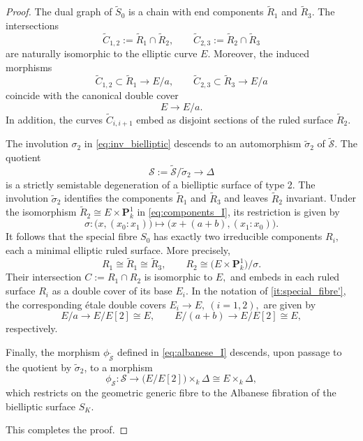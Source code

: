 \documentclass[10pt,a4paper]{amsart}
\newcommand{\bbP}{\mathbf{P}}
\newcommand{\ca}[1]{{\mathcal{#1}}}
\begin{document}
\begin{proof}
The dual graph of $\widetilde{S}_{0}$ is a chain with end components $\widetilde{R}_{1}$ and $ \widetilde{R}_{3}$. The intersections 
\begin{equation*}
    \widetilde{C}_{1,2}:= \widetilde{R}_{1}\cap \widetilde{R}_{2},\qquad \widetilde{C}_{2,3}:=\widetilde{R}_{2}\cap \widetilde{R}_{3}
\end{equation*}
are naturally isomorphic to the elliptic curve $E$. Moreover, the induced morphisms $$ \widetilde{C}_{1,2}\subset \widetilde{R}_{1} \longrightarrow E/a,\qquad \widetilde{C}_{2,3}\subset \widetilde{R}_{3} \longrightarrow E/a$$ coincide with the canonical double cover $$E\longrightarrow E/a.$$ In addition, the curves $\widetilde{C}_{i,i+1}$ embed as disjoint sections of the ruled surface $\widetilde{R}_{2}$.\par
The involution $\sigma_{2}$ in \eqref{eq:inv_bielliptic} descends to an automorphism $\widetilde{\sigma}_{2}$ of $\widetilde{\ca S}$. The quotient \begin{equation}\label{eq:deg_II}
    \ca S:=\widetilde{\ca S}/\widetilde{\sigma}_{2}\longrightarrow\Delta
\end{equation}
is a strictly semistable degeneration of a bielliptic surface of type 2. The involution $\widetilde{\sigma}_{2}$ identifies the components $\widetilde{R}_{1}$ and $\widetilde{R}_{3}$ and leaves $\widetilde{R}_{2}$ invariant. Under the isomorphism $\widetilde{R}_{2}\cong E \times \bbP^1_k$ in \eqref{eq:components_I}, its restriction is given by $$\sigma\colon\bigl(x,(x_{0}:x_{1})\bigr)\longmapsto \bigl(x+(a+b),(x_{1}:x_{0})\bigr).$$
It follows that the special fibre $S_{0}$ has exactly two irreducible components $R_{i},$ each a minimal elliptic ruled surface. More precisely, 
\begin{equation}\label{eq:components_II}
R_{1}\cong \widetilde{R}_{1}\cong \widetilde{R}_{3},\qquad R_{2}\cong \bigl(E\times\bbP^1_{k}\bigr)/\sigma.
\end{equation}
Their intersection $C:=R_{1}\cap R_{2}$ is isomorphic to $E,$ and embeds in each ruled surface $R_{i}$ as a double cover of its base $E_{i}$. In the notation of \eqref{it:special_fibre'}, the corresponding \'etale double covers $E_{i}\to E,\ (i=1,2),$ are given by \begin{equation}\label{eq:double_covers}
    E/a\longrightarrow E/E[2]\cong E,\qquad E/(a+b)\longrightarrow E/E[2]\cong E,
\end{equation}
respectively.\par
Finally, the morphism $\phi_{\widetilde{\ca S}}$ defined in \eqref{eq:albanese_I} descends, upon passage to the quotient by $\widetilde{\sigma}_{2}$, to a morphism 
\begin{equation}\label{eq:albanese_II}
\phi_{\ca S}\colon \ca S\longrightarrow \bigl(E/E[2]\bigr)\times_{k}\Delta\cong E\times_{k}\Delta,
\end{equation}
which restricts on the geometric generic fibre to the Albanese fibration of the bielliptic surface $S_{K}$.\par
This completes the proof.
\end{proof}
\end{document}

